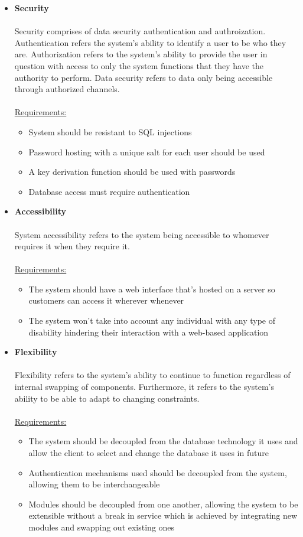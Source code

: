 \documentclass[a4paper,10pt]{article}
\begin{document}
\begin{itemize}
\begin{itemize}
	\end{itemize}
	\item  \textbf{Security} \\\\
	Security comprises of data security authentication and authroization. Authentication refers the system’s ability to identify a user to be who they are. Authorization refers to the system’s ability to provide the user in question with access to only the system functions that they have the authority to perform. Data security 			refers to data only being accessible through authorized channels.\\\\
	 \underline{Requirements:}
	 \begin{itemize}
		\item System should be resistant to SQL injections
		\item Password hosting with a unique salt for each user should be used
		\item A key derivation function should be used with passwords
		\item Database access must require authentication
	\end{itemize}
	\item  \textbf{Accessibility} \\\\
	System accessibility refers to the system being accessible to whomever requires it when they require it.\\\\
	 \underline{Requirements:}
	 \begin{itemize}
		\item The system should have a web interface that’s hosted on a server so customers can access it wherever whenever
		\item The system won’t take into account any individual with any type of disability hindering their interaction with a web-based application
	\end{itemize}
	\item  \textbf{Flexibility} \\\\
	Flexibility refers to the system’s ability to continue to function regardless of internal swapping of components. Furthermore, it refers to the system’s ability to be able to adapt to changing constraints.\\\\
	 \underline{Requirements:}
	 \begin{itemize}
		\item The system should be decoupled from the database technology it uses and allow the client to select and change the database it uses in future
		\item Authentication mechanisms used should be decoupled from the system, allowing them to be interchangeable
		\item Modules should be decoupled from one another, allowing the system to be extensible without a break in service which is achieved by integrating new modules and swapping out existing ones
	\end{itemize}
\end{itemize}
\end{document}
